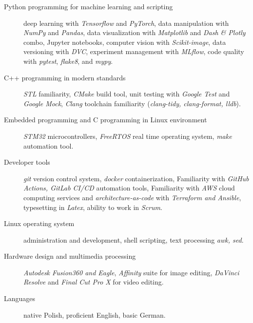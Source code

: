 \documentclass{article}
\begin{document}
\begin{description}
	\item[Python programming for machine learning and scripting]
		deep learning with \textit{Tensorflow} and \textit{PyTorch},
		data manipulation with \textit{NumPy} and \textit{Pandas},
		data visualization with \textit{Matplotlib} and \textit{Dash \& Plotly} combo,
		Jupyter notebooks,
		computer vision with \textit{Scikit-image},
		data versioning with \textit{DVC},
		experiment management with \textit{MLflow},
		code quality with \textit{pytest}, \textit{flake8}, and \textit{mypy}.
	\item[C++ programming in modern standards]
		\textit{STL} familiarity,
		\textit{CMake} build tool,
		unit testing with \textit{Google Test} and \textit{Google Mock},
		\textit{Clang} toolchain familiarity (\textit{clang-tidy, clang-format, lldb}).
	\item[Embedded programming and C programming in Linux environment]
		\textit{STM32} microcontrollers,
		\textit{FreeRTOS} real time operating system,
		\textit{make} automation tool.
	\item[Developer tools]
		\textit{git} version control system,
		\textit{docker} containerization,
		Familiarity with \textit{GitHub Actions, GitLab CI/CD} automation tools,
		Familiarity with \textit{AWS} cloud computing services and \textit{architecture-as-code} with \textit{Terraform and Ansible},
		typesetting in \textit{Latex},
		ability to work in \textit{Scrum}.
	\item[Linux operating system]
		administration and development,
		shell scripting,
		text processing \textit{awk, sed}.
	\item[Hardware design and multimedia processing]
		\textit{Autodesk Fusion360 and Eagle},
		\textit{Affinity} suite for image editing,
		\textit{DaVinci Resolve} and \textit{Final Cut Pro X} for video editing.
	\item[Languages]
		native Polish,
		proficient English,
		basic German.
\end{description}
\end{document}

